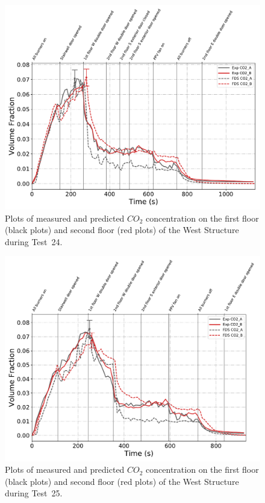 \begin{figure}[!h]
	\centering
	\includegraphics[width=\columnwidth]{Figures/Plots/Validation/Gas_Concentration/Test_24_CO2}
	\caption[Plots of measured and predicted $CO_2$ concentration during Test~24.]{Plots of measured and predicted $CO_2$ concentration on the first floor (black plots) and second floor (red plots) of the West Structure during Test~24.}
	\label{fig:Test24_CO2}
\end{figure}

\begin{figure}[!h]
	\centering
	\includegraphics[width=\columnwidth]{Figures/Plots/Validation/Gas_Concentration/Test_25_CO2}
	\caption[Plots of measured and predicted $CO_2$ concentration during Test~25.]{Plots of measured and predicted $CO_2$ concentration on the first floor (black plots) and second floor (red plots) of the West Structure during Test~25.}
	\label{fig:Test25_CO2}
\end{figure}

